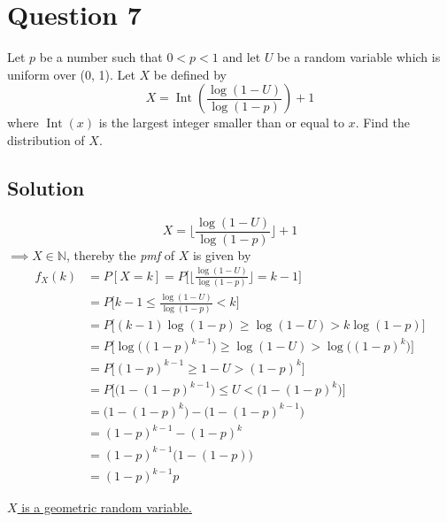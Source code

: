 \section*{Question 7}

Let \(p\) be a number such that \(0<p<1\) and let \(U\) be a random variable which is uniform over (0, 1).
Let \(X\) be defined by
\begin{equation*}
    X = \operatorname{Int} \left( \frac{\log (1-U)}{\log (1-p)} \right) + 1
\end{equation*}
where \(\operatorname{Int}(x)\) is the largest integer smaller than or equal to \(x\).
Find the distribution of \(X\).

\subsection*{Solution}

\begin{equation*}
    X = \Bigg\lfloor \frac{\log (1-U)}{\log (1-p)} \Bigg\rfloor + 1
\end{equation*}
\( \implies X \in \mathbb{N} \), thereby the \textit{pmf} of \( X \) is given by
\begin{align*}
    f_X(k)
     & =
    P[X=k]
    =
    P\Bigg[\Bigg\lfloor \frac{\log (1-U)}{\log (1-p)} \Bigg\rfloor = k-1\Bigg]
    \\ & =
    P\Bigg[k-1 \leq \frac{\log (1-U)}{\log (1-p)} < k \Bigg]
    \\ & =
    P\Bigg[(k-1) \log (1-p) \geq \log (1-U) > k \log (1-p) \Bigg]
    \\ & =
    P\Bigg[\log \Big({(1-p)}^{k-1}\Big) \geq \log (1-U) > \log \Big({(1-p)}^{k}\Big) \Bigg]
    \\ & =
    P\Bigg[{(1-p)}^{k-1} \geq 1-U > {(1-p)}^{k} \Bigg]
    \\ & =
    P\Bigg[\Big(1 - {(1-p)}^{k-1}\Big) \leq U < \Big(1 - {(1-p)}^{k}\Big) \Bigg]
    \\ & =
    \Big(1 - {(1-p)}^{k}\Big) - \Big(1 - {(1-p)}^{k-1}\Big)
    \\ & =
    {(1-p)}^{k-1} - {(1-p)}^{k}
    \\ & =
    {(1-p)}^{k-1} \Big(1 - (1-p)\Big)
    \\ & =
    {(1-p)}^{k-1} p
\end{align*}

\underline{\( X \) is a geometric random variable.}
